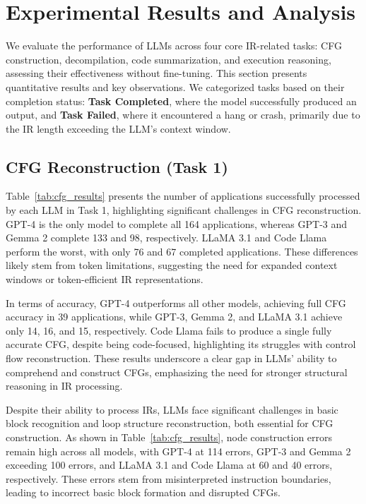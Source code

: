 \section{Experimental Results and Analysis}
\label{sec:results}

We evaluate the performance of LLMs across four core IR-related tasks: CFG construction, decompilation, code summarization, and execution reasoning, assessing their effectiveness without fine-tuning. This section presents quantitative results and key observations. We categorized tasks based on their completion status: \textbf{Task Completed}, where the model successfully produced an output, and \textbf{Task Failed}, where it encountered a hang or crash, primarily due to the IR length exceeding the LLM’s context window.


\subsection{CFG Reconstruction (Task 1)}
Table~\ref{tab:cfg_results} presents the number of applications successfully processed by each LLM in Task 1, highlighting significant challenges in CFG reconstruction. GPT-4 is the only model to complete all 164 applications, whereas GPT-3 and Gemma 2 complete 133 and 98, respectively. LLaMA 3.1 and Code Llama perform the worst, with only 76 and 67 completed applications. These differences likely stem from token limitations, suggesting the need for expanded context windows or token-efficient IR representations.

In terms of accuracy, GPT-4 outperforms all other models, achieving full CFG accuracy in 39 applications, while GPT-3, Gemma 2, and LLaMA 3.1 achieve only 14, 16, and 15, respectively. Code Llama fails to produce a single fully accurate CFG, despite being code-focused, highlighting its struggles with control flow reconstruction. These results underscore a clear gap in LLMs’ ability to comprehend and construct CFGs, emphasizing the need for stronger structural reasoning in IR processing.




Despite their ability to process IRs, LLMs face significant challenges in basic block recognition and loop structure reconstruction, both essential for CFG construction. As shown in Table~\ref{tab:cfg_results}, node construction errors remain high across all models, with GPT-4 at 114 errors, GPT-3 and Gemma 2 exceeding 100 errors, and LLaMA 3.1 and Code Llama at 60 and 40 errors, respectively. These errors stem from misinterpreted instruction boundaries, leading to incorrect basic block formation and disrupted CFGs.

